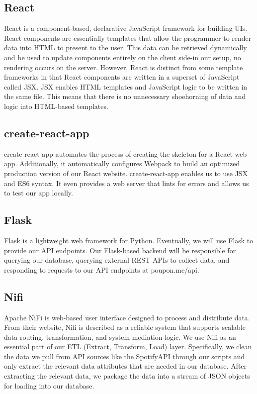 \documentclass{scrartcl}
\begin{document}
    \subsection{React}\label{subsec:react}
    React is a component-based, declarative JavaScript framework for building UIs.
    React components are essentially templates that allow the programmer to render data into HTML to present to the user.
    This data can be retrieved dynamically and be used to update components entirely on the client side-in our setup, no rendering occurs on the server.
    However, React is distinct from some template frameworks in that React components are written in a superset of JavaScript called JSX.
    JSX enables HTML templates and JavaScript logic to be written in the same file.
    This means that there is no unnecessary shoehorning of data and logic into HTML-based templates.

    \newpage
    \subsection{create-react-app}\label{subsec:create-react-app}
    create-react-app automates the process of creating the skeleton for a React web app.
    Additionally, it automatically configures Webpack to build an optimized production version of our React website.
    create-react-app enables us to use JSX and ES6 syntax.
    It even provides a web server that lints for errors and allows us to test our app locally.

    \subsection{Flask}\label{subsec:flask}
    Flask is a lightweight web framework for Python.
    Eventually, we will use Flask to provide our API endpoints.
    Our Flask-based backend will be responsible for querying our database, querying external REST APIs to collect data, and responding to requests to our API endpoints at poupon.me/api.

    \subsection{Nifi}\label{subsec:nifi}
    Apache NiFi is web-based user interface designed to process and distribute data.
    From their website, Nifi is described as a reliable system that supports scalable data routing, transformation, and system mediation logic.
    We use Nifi as an essential part of our ETL (Extract, Transform, Load) layer.
    Specifically, we clean the data we pull from API sources like the SpotifyAPI through our scripts and only extract the relevant data attributes that are needed in our database.
    After extracting the relevant data, we package the data into a stream of JSON objects for loading into our database.
\end{document}
